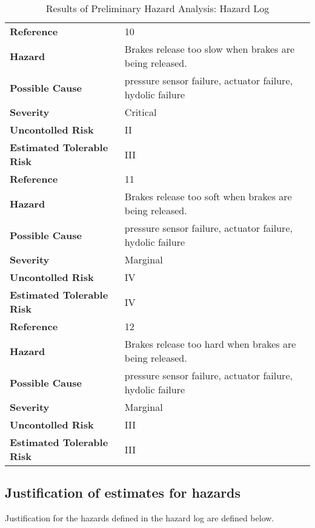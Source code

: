 \documentclass{article}
\begin{document}
\begin{table}[h!tbp]
\begin{center}
\begin{tabular}{|l|l|}
\hline
\textbf{Reference}&	10\\
\textbf{Hazard}&	Brakes release too slow when brakes are being released.\\
\textbf{Possible Cause}& pressure sensor failure, actuator failure, hydolic failure	\\
\textbf{Severity}&	Critical\\
\textbf{Uncontolled Risk}&	II\\
\textbf{Estimated Tolerable Risk}&	III\\
\hline
\hline
\textbf{Reference}&	11\\
\textbf{Hazard}&	Brakes release too soft when brakes are being released.\\
\textbf{Possible Cause}&	pressure sensor failure, actuator failure, hydolic failure\\
\textbf{Severity}&	Marginal\\
\textbf{Uncontolled Risk}&	IV\\
\textbf{Estimated Tolerable Risk}&	IV\\
\hline
\textbf{Reference}&	12\\
\textbf{Hazard}&	Brakes release too hard when brakes are being released.\\
\textbf{Possible Cause}&	pressure sensor failure, actuator failure, hydolic failure\\
\textbf{Severity}&	Marginal\\
\textbf{Uncontolled Risk}&	III\\
\textbf{Estimated Tolerable Risk}&	III\\
\hline
\end{tabular}
\end{center}
\caption{Results of Preliminary Hazard Analysis: Hazard Log}
\label{fig:HazardLogTable4}
\end{table}

\subsection{Justification of estimates for hazards}
\noindent
Justification for the hazards defined in the hazard log are defined below.
\end{document}
